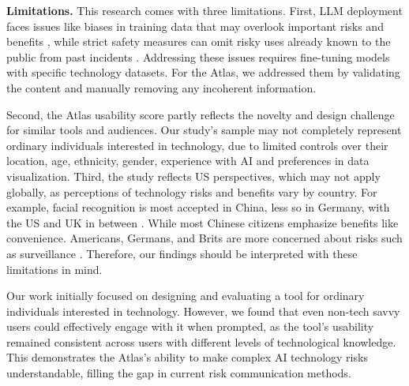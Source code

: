 \vspace{1pt}

\noindent\textbf{Limitations.} This research comes with three limitations. First, LLM deployment faces issues like biases in training data that may overlook important risks and benefits \cite{luccioni2024stable}, while strict safety measures can omit risky uses already known to the public from past incidents \cite{AIRiskDatabase}. Addressing these issues requires fine-tuning models with specific technology datasets. For the Atlas, we addressed them by validating the content and manually removing any incoherent information.

Second, the Atlas usability score partly reflects the novelty and design challenge for similar tools and audiences. Our study's sample may not completely represent ordinary individuals interested in technology, due to limited controls over their location, age, ethnicity, gender, experience with AI and preferences in data visualization. Third, the study reflects US perspectives, which may not apply globally, as perceptions of technology risks and benefits vary by country. For example, facial recognition is most accepted in China, less so in Germany, with the US and UK in between \cite{frtPerceptions2021}. While most Chinese citizens emphasize benefits like convenience. Americans, Germans, and Brits are more concerned about risks such as surveillance \cite{frtCrossCountryPerceptions_2023}. Therefore, our findings should be interpreted with these limitations in mind.

Our work initially focused on designing and evaluating a tool for ordinary individuals interested in technology. However, we found that even non-tech savvy users could effectively engage with it when prompted, as the tool’s usability remained consistent across users with different levels of technological knowledge. This demonstrates the Atlas's ability to make complex AI technology risks understandable, filling the gap in current risk communication methods.